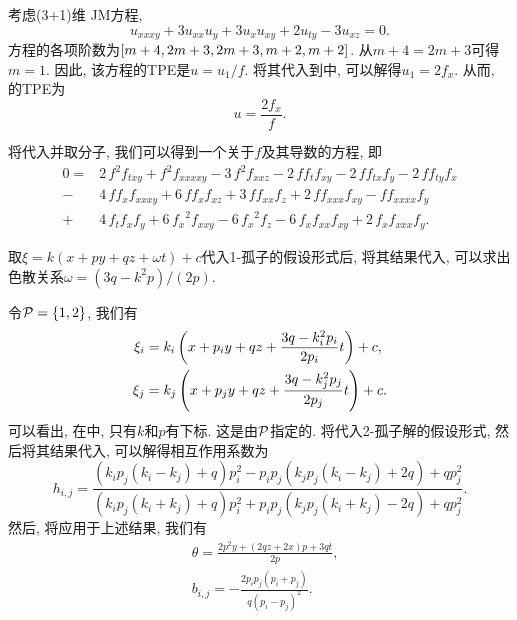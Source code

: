 考虑(3+1)维 JM方程\CITEcaJM,
\begin{equation}
    u_{xxxy}+3u_{xx}u_y+3u_{x}u_{xy}+2u_{ty}-3u_{xz}=0. \label{JMEQ3}
\end{equation}
方程的各项阶数为$\left[m+4,2m+3,2m+3,m+2,m+2\right]$. 从$m+4=2m+3$可得$m=1$. 因此, 该方程的TPE是$u=u_1/f$. 将其代入到中, 可以解得$u_1=2f_x$. 从而, 的TPE为 
\begin{equation}
u=\frac{2f_x}{f}. \label{JMEQ-tr}    
\end{equation}

将代入并取分子, 我们可以得到一个关于$f$及其导数的方程, 即 
\begin{equation}
\begin{split}
0=&2\,{f}^{2}f_{{{ txy}}}+{f}^{2}f_{{{ xxxxy}}}-3\,{f}^{2}f_{{{ xxz}}}-2\,ff_{{t}}f_{{{ xy}}}-2\,ff_{{{ tx}}}f_{{y}}-2\,ff_{{{ ty}}}f_{{x}}\\
-&4\,ff_{{x}}f_{{{ xxxy}}}+6\,ff_{{x}}f_{{{ xz}}}+3\,ff_{{{ xx}}}f_{{z}}+2\,ff_{{{ xxx}}}f_{{{xy}}}-ff_{{{ xxxx}}}f_{{y}}\\
+&4\,f_{{t}}f_{{x}}f_{{y}}+6\,{f_{{x}}}^{2}f_{{{ xxy}}}-6\,{f_{{x}}}^{2}f_{{z}}-6\,f_{{x}}f_{{{ xx}}}f_{{{ xy}}}+2\,f_{{x}}f_{{{ xxx}}}f_{{y}}. \label{JMEQ-feq}
\end{split}
\end{equation}

取$\xi=k(x+py+qz+\omega t)+c$代入1-孤子的假设形式后, 将其结果代入, 可以求出色散关系$\omega=(3q-k^2p)/(2p)$.

令$\mathcal{P}=\left\{1,2\right\}$, 我们有
\begin{equation}
\begin{split}
\xi_i&=k_i\left(x+p_iy+qz+\frac{3q-k_i^2p_i}{2p_i}t\right)+c, \\ 
\xi_j&=k_j\left(x+p_jy+qz+\frac{3q-k_j^2p_j}{2p_j}t\right)+c.
\end{split} \label{JMEQ-xij}
\end{equation}
可以看出, 在中, 只有$k$和$p$有下标. 这是由$\mathcal{P}$指定的. 将代入2-孤子解的假设形式, 然后将其结果代入, 可以解得相互作用系数为
\begin{equation}
    h_{i,j}=\frac{(k_ip_j(k_i-k_j)+q)p_i^2-p_ip_j(k_jp_j(k_i-k_j)+2q)+qp_j^2}{(k_ip_j(k_i+k_j)+q)p_i^2+p_ip_j(k_jp_j(k_i+k_j)-2q)+qp_j^2}.
\end{equation}
然后, 将应用于上述结果, 我们有
\begin{equation}
\begin{split}
&\theta=\frac{2p^2y+(2qz+2x)p+3qt}{2p}, \\ 
&b_{i,j}=-\frac{2p_ip_j(p_i+p_j)}{q(p_i-p_j)^2}.
\end{split}
\end{equation}

